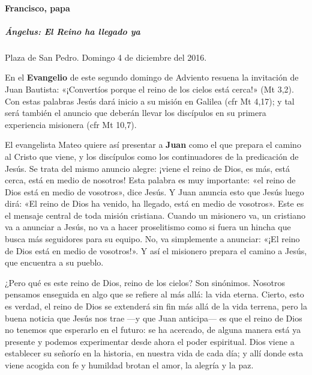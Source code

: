 \documentclass[]{article}
\let\oldparagraph\paragraph
\renewcommand{\paragraph}[1]{\oldparagraph{#1}\mbox{}}
\let\oldsubparagraph\subparagraph
\renewcommand{\subparagraph}[1]{\oldsubparagraph{#1}\mbox{}}
\begin{document}
\protect\hypertarget{_Toc448662730}{}{\protect\hypertarget{_Toc448690249}{}{\protect\hypertarget{_Toc448708272}{}{\protect\hypertarget{_Toc448709358}{}{\protect\hypertarget{_Toc449554360}{}{}}}}}

\paragraph{Francisco, papa}\label{francisco-papa-1}

\subparagraph{Ángelus: El Reino ha llegado
ya}\label{uxe1ngelus-el-reino-ha-llegado-ya}

Plaza de San Pedro. Domingo 4 de diciembre del 2016.

En el \textbf{Evangelio} de este segundo domingo de Adviento resuena la
invitación de Juan Bautista: «¡Convertíos porque el reino de los cielos
está cerca!» (Mt 3,2). Con estas palabras Jesús dará inicio a su misión
en Galilea (cfr Mt 4,17); y tal será también el anuncio que deberán
llevar los discípulos en su primera experiencia misionera (cfr Mt 10,7).

El evangelista Mateo quiere así presentar a \textbf{Juan} como el que
prepara el camino al Cristo que viene, y los discípulos como los
continuadores de la predicación de Jesús. Se trata del mismo anuncio
alegre: ¡viene el reino de Dios, es más, está cerca, está en medio de
nosotros! Esta palabra es muy importante: «el reino de Dios está en
medio de vosotros», dice Jesús. Y Juan anuncia esto que Jesús luego
dirá: «El reino de Dios ha venido, ha llegado, está en medio de
vosotros». Este es el mensaje central de toda misión cristiana. Cuando
un misionero va, un cristiano va a anunciar a Jesús, no va a hacer
proselitismo como si fuera un hincha que busca más seguidores para su
equipo. No, va simplemente a anunciar: «¡El reino de Dios está en medio
de vosotros!». Y así el misionero prepara el camino a Jesús, que
encuentra a su pueblo.

¿Pero qué es este reino de Dios, reino de los cielos? Son sinónimos.
Nosotros pensamos enseguida en algo que se refiere al más allá: la vida
eterna. Cierto, esto es verdad, el reino de Dios se extenderá sin fin
más allá de la vida terrena, pero la buena noticia que Jesús nos trae
---y que Juan anticipa--- es que el reino de Dios no tenemos que
esperarlo en el futuro: se ha acercado, de alguna manera está ya
presente y podemos experimentar desde ahora el poder espiritual. Dios
viene a establecer su señorío en la historia, en nuestra vida de cada
día; y allí donde esta viene acogida con fe y humildad brotan el amor,
la alegría y la paz.
\end{document}

